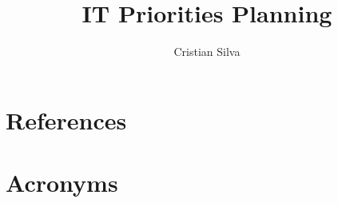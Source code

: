 \documentclass[PMO,authoryear,toc]{lsstdoc}
\title{IT Priorities Planning}
\author{%
Cristian Silva
}
\date{\vcsDate}
\begin{document}
\maketitle





\appendix
\section{References} \label{sec:bib}
\renewcommand{\refname}{} %


\section{Acronyms} \label{sec:acronyms}

\end{document}
